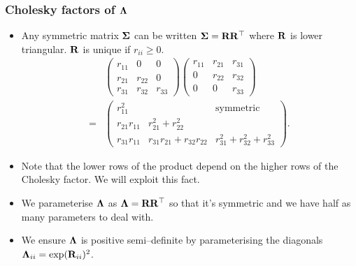 \documentclass{beamer}
\begin{document}
	\begin{frame}
		\frametitle{Cholesky factors of ${\boldsymbol \Lambda}$}
		\begin{itemize}
			\item Any symmetric matrix ${\boldsymbol \Sigma}$ can be written ${\boldsymbol \Sigma} = {\bf R} {\bf R}^\top$
			      where ${\bf R}$ is lower triangular. ${\bf R}$ is unique if $r_{ii} \geq 0$. 
			      \begin{align*}
			      	&\begin{pmatrix}
			      	r_{11}        & 0                            & 0                               \\
			      	r_{21}        & r_{22}                       & 0                               \\
			      	r_{31}        & r_{32}                       & r_{33}                          
			      	\end{pmatrix}
			      	\begin{pmatrix}
			      	r_{11}        & r_{21}                       & r_{31}                          \\
			      	0             & r_{22}                       & r_{32}                          \\
			      	0             & 0                            & r_{33}                          
			      	\end{pmatrix}
			      	\\
			      	=& \begin{pmatrix}
			      	r_{11}^2      &                              & \text{symmetric}                \\
			      	r_{21}r_{11} & r_{21}^2 + r_{22}^2 \\
			      	r_{31} r_{11} & r_{31}r_{21} + r_{32} r_{22} & r_{31}^2 + r_{32} ^2 + r_{33}^2 
			      	\end{pmatrix}.
			      \end{align*}
			\item Note that the lower rows of the product depend on the higher rows of the Cholesky factor. We will
			      exploit this fact.
			\item We parameterise ${\boldsymbol \Lambda}$ as ${\boldsymbol \Lambda} = {\bf R} {\bf R}^\top$ so that it's symmetric
			      and	we have half as many parameters to deal with.
			\item We ensure ${\boldsymbol \Lambda}$ is positive semi--definite by parameterising the diagonals
			      ${\boldsymbol \Lambda}_{ii} = \exp({\bf R}_{ii})^2$.
		\end{itemize}	
	\end{frame}
			
\end{document}
